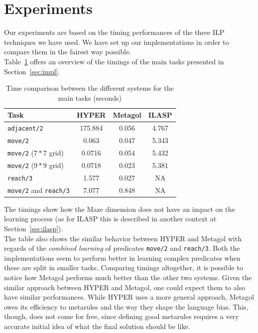 \newpage
\section{Experiments}\label{sec:exp}
Our experiments are based on the timing performances of the three ILP techniques
we have used. We have set up our implementations in order to compare them in the
fairest way possible.\\
Table~\ref{tab:prf_cmp} offers an overview of the timings of the main tasks presented in Section~\ref{sec:impl}.
{
\begin{center}
    \begin{table}[h]
    \centering
    \begin{tabular}{ |l|c|c|c| } 
        \hline
        Task & \textbf{HYPER} & \textbf{Metagol} & \textbf{ILASP} \\ \hline
        \texttt{adjacent/2} & 175.884 & 0.056 & 4.767 \\ 
        \texttt{move/2} & 0.063 & 0.047 & 5.343 \\ 
        \texttt{move/2} (\(7*7\) grid) & 0.0716 & 0.054 & 5.432 \\
        \texttt{move/2} (\(9*9\) grid) & 0.0718 & 0.023 & 5.381 \\
        \texttt{reach/3} & 1.577 & 0.027 & NA \\ 
        \texttt{move/2} and \texttt{reach/3} & 7.077 & 0.848 & NA \\ 
        \hline
    \end{tabular}
    \caption{\label{tab:prf_cmp}Time comparison between the different systems for the main tasks (seconds)}
\end{table}
\end{center}
}
The timings show how the Maze dimension does not have an impact on the learning process (as for ILASP this is described
in another context at Section~\ref{sec:ilasp}).\\
The table also shows the similar behavior between HYPER and Metagol with regards of the \emph{combined
learning} of predicates \texttt{move/2} and \texttt{reach/3}. Both the implementations seem to
perform better in learning complex predicates when these are split in smaller tasks.
Comparing timings altogether, it is possible to notice how Metagol performs much better than the other
two systems. Given the similar approach between HYPER and Metagol, one could expect them
to also have similar performances. While HYPER uses a more general approach, Metagol owes its efficiency to metarules and the way they shape the language bias. This, though, does not come
for free, since defining good metarules requires a very accurate initial idea of what the final solution should be like.\\

